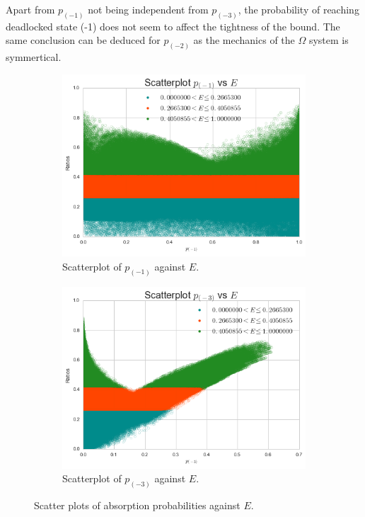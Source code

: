 \documentclass{article}
\numberwithin{equation}{section}
\begin{document}
Apart from $p_{(-1)}$ not being independent from $p_{(-3)}$, the probability of reaching deadlocked state (-1) does not seem to affect the tightness of the bound.
The same conclusion can be deduced for $p_{(-2)}$ as the mechanics of the $\Omega$ system is symmertical.

\begin{figure}[!htbp]
\begin{subfigure}[b]{0.5\textwidth}
  \includegraphics[width=\textwidth]{images/scatter_p1_ratio_p}
  \caption{Scatterplot of $p_{(-1)}$ against $E$.}
  \label{fig:scatter_p1}
\end{subfigure}
\begin{subfigure}[b]{0.5\textwidth}
  \includegraphics[width=\textwidth]{images/scatter_p3_ratio_p}
  \caption{Scatterplot of $p_{(-3)}$ against $E$.}
  \label{fig:scatter_p3}
\end{subfigure}
\caption{Scatter plots of absorption probabilities against $E$.}
\label{fig:pscatterplot_ratio_analysis}
\end{figure}
\end{document}
